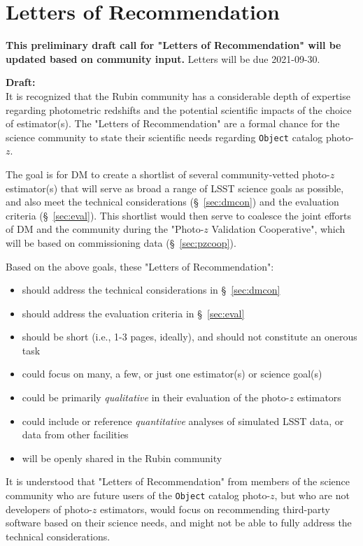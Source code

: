 \documentclass[DM,lsstdraft,toc]{lsstdoc}
\begin{document}
\section{Letters of Recommendation} \label{sec:lor}

\textbf{This preliminary draft call for "Letters of Recommendation" will be updated based on community input.} Letters will be due 2021-09-30.

\textbf{Draft:} \\
It is recognized that the Rubin community has a considerable depth of expertise regarding photometric redshifts and the potential scientific impacts of the choice of estimator(s).
The "Letters of Recommendation" are a formal chance for the science community to state their scientific needs regarding {\tt Object} catalog photo-$z$.

The goal is for DM to create a shortlist of several community-vetted photo-$z$ estimator(s) that will serve as broad a range of LSST science goals as possible, and also meet the technical considerations (\S~\ref{sec:dmcon}) and the evaluation criteria (\S~\ref{sec:eval}).
This shortlist would then serve to coalesce the joint efforts of DM and the community during the  "Photo-$z$ Validation Cooperative", which will be based on commissioning data (\S~\ref{sec:pzcoop}). 

Based on the above goals, these "Letters of Recommendation":
\begin{itemize}
\item should address the technical considerations in \S~\ref{sec:dmcon}
\item should address the evaluation criteria in  \S~\ref{sec:eval}
\item should be short (i.e., 1-3 pages, ideally), and should not constitute an onerous task
\item could focus on many, a few, or just one estimator(s) or science goal(s)
\item could be primarily {\it qualitative} in their evaluation of the photo-$z$ estimators
\item could include or reference {\it quantitative} analyses of simulated LSST data, or data from other facilities
\item will be openly shared in the Rubin community
\end{itemize}

It is understood that "Letters of Recommendation" from members of the science community who are future users of the {\tt Object} catalog photo-$z$, but who are not developers of photo-$z$ estimators, would focus on recommending third-party software based on their science needs, and might not be able to fully address the technical considerations.
\end{document}
